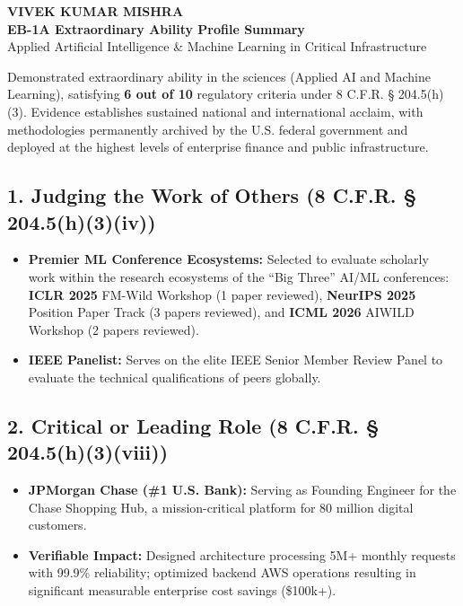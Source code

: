 \documentclass[11pt,a4paper]{article}
\begin{document}
\pagestyle{empty}

\begin{center}
    {\LARGE \textbf{VIVEK KUMAR MISHRA}} \\
    \vspace{2mm}
    {\large \textbf{EB-1A Extraordinary Ability Profile Summary}} \\
    \vspace{1mm}
    Applied Artificial Intelligence \& Machine Learning in Critical Infrastructure
\end{center}

\vspace{3mm}

\vspace{1ex}

Demonstrated extraordinary ability in the sciences (Applied AI and Machine Learning), satisfying \textbf{6 out of 10} regulatory criteria under 8 C.F.R. § 204.5(h)(3). Evidence establishes sustained national and international acclaim, with methodologies permanently archived by the U.S. federal government and deployed at the highest levels of enterprise finance and public infrastructure.
\vspace{2ex}

\vspace{1ex}

\subsection*{1. Judging the Work of Others (8 C.F.R. § 204.5(h)(3)(iv))}
\begin{itemize}
    \item \textbf{Premier ML Conference Ecosystems:} Selected to evaluate scholarly work within the research ecosystems of the ``Big Three'' AI/ML conferences: \textbf{ICLR 2025} FM-Wild Workshop (1 paper reviewed), \textbf{NeurIPS 2025} Position Paper Track (3 papers reviewed), and \textbf{ICML 2026} AIWILD Workshop (2 papers reviewed).
    \item \textbf{IEEE Panelist:} Serves on the elite IEEE Senior Member Review Panel to evaluate the technical qualifications of peers globally.
\end{itemize}

\subsection*{2. Critical or Leading Role (8 C.F.R. § 204.5(h)(3)(viii))}
\begin{itemize}
    \item \textbf{JPMorgan Chase (\#1 U.S. Bank):} Serving as Founding Engineer for the Chase Shopping Hub, a mission-critical platform for 80 million digital customers.
    \item \textbf{Verifiable Impact:} Designed architecture processing 5M+ monthly requests with 99.9\% reliability; optimized backend AWS operations resulting in significant measurable enterprise cost savings (\$100k+).
\end{itemize}
\end{document}
